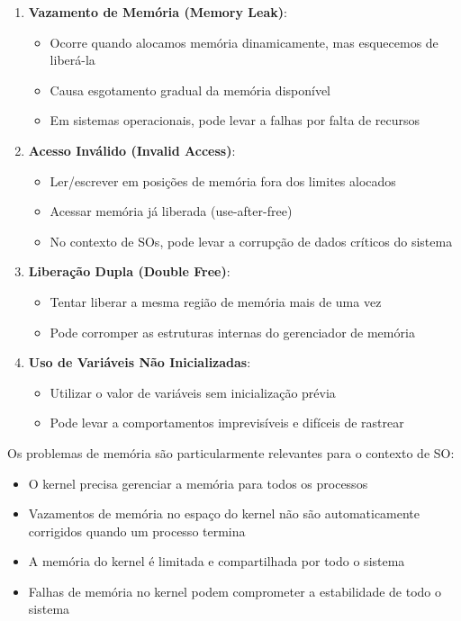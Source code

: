 \documentclass[11pt,a4paper]{article}
\begin{document}
\begin{enumerate}
    \item \textbf{Vazamento de Memória (Memory Leak)}: 
    \begin{itemize}
        \item Ocorre quando alocamos memória dinamicamente, mas esquecemos de liberá-la
        \item Causa esgotamento gradual da memória disponível
        \item Em sistemas operacionais, pode levar a falhas por falta de recursos
    \end{itemize}

    \item \textbf{Acesso Inválido (Invalid Access)}:
    \begin{itemize}
        \item Ler/escrever em posições de memória fora dos limites alocados
        \item Acessar memória já liberada (use-after-free)
        \item No contexto de SOs, pode levar a corrupção de dados críticos do sistema
    \end{itemize}

    \item \textbf{Liberação Dupla (Double Free)}:
    \begin{itemize}
        \item Tentar liberar a mesma região de memória mais de uma vez
        \item Pode corromper as estruturas internas do gerenciador de memória
    \end{itemize}

    \item \textbf{Uso de Variáveis Não Inicializadas}:
    \begin{itemize}
        \item Utilizar o valor de variáveis sem inicialização prévia
        \item Pode levar a comportamentos imprevisíveis e difíceis de rastrear
    \end{itemize}
\end{enumerate}

\begin{tcolorbox}[colback=lightblue!20, colframe=mackblue, title=\emoji{light-bulb} Relação com Sistemas Operacionais]
Os problemas de memória são particularmente relevantes para o contexto de SO:
\begin{itemize}
    \item O kernel precisa gerenciar a memória para todos os processos
    \item Vazamentos de memória no espaço do kernel não são automaticamente corrigidos quando um processo termina
    \item A memória do kernel é limitada e compartilhada por todo o sistema
    \item Falhas de memória no kernel podem comprometer a estabilidade de todo o sistema
\end{itemize}
\end{tcolorbox}
\end{document}
